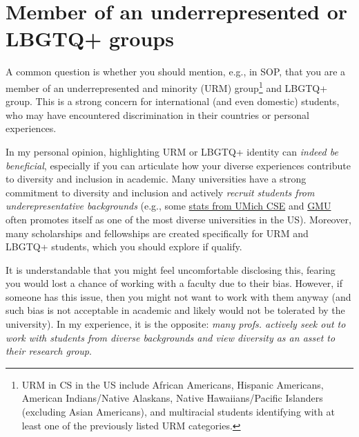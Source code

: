 \documentclass[oneside,11pt]{book}
\begin{document}

\section{Member of an underrepresented or LBGTQ+ groups}\label{sec:urm}
A common question is whether you should mention, e.g., in SOP, that you are a member of an underrepresented and minority (URM) group\footnote{URM in CS in the US include African Americans, Hispanic Americans, American Indians/Native Alaskans, Native Hawaiians/Pacific Islanders (excluding Asian Americans), and multiracial students identifying with at least one of the previously listed URM categories.} and LBGTQ+ group. 
This is a strong concern for international (and even domestic) students, who may have encountered discrimination in their countries or personal experiences.

In my personal opinion, highlighting URM or LBGTQ+ identity can \emph{indeed be beneficial}, especially if you can articulate how your diverse experiences contribute to diversity and inclusion in academic.  Many universities have a strong commitment to diversity and inclusion and actively 
\emph{recruit students from underepresentative backgrounds} (e.g., some \href{https://cse-climate.engin.umich.edu/reports/climate-dei-reports/cse-climate-and-dei-report-2022-2023/#grad-ethnicity}{stats from UMich CSE} and \href{https://www.gmu.edu/news/2022-09/mason-now-top-10-public-university-diversity-innovation-and-cybersecurity-education-us}{GMU} often promotes itself as one of the most diverse universities in the US). Moreover, many scholarships and fellowships are created specifically for URM and LBGTQ+ students, which you should explore if qualify.

It is understandable that you might feel uncomfortable disclosing this, fearing you would lost a chance of working with a faculty due to their bias.  However, if someone has this issue, then you might not want to work with them anyway (and such bias is not acceptable in academic and likely would not be tolerated by the university). In my experience, it is the opposite: \emph{many profs. actively seek out to work with students from diverse backgrounds and view diversity as an asset to their research group}.
\end{document}
